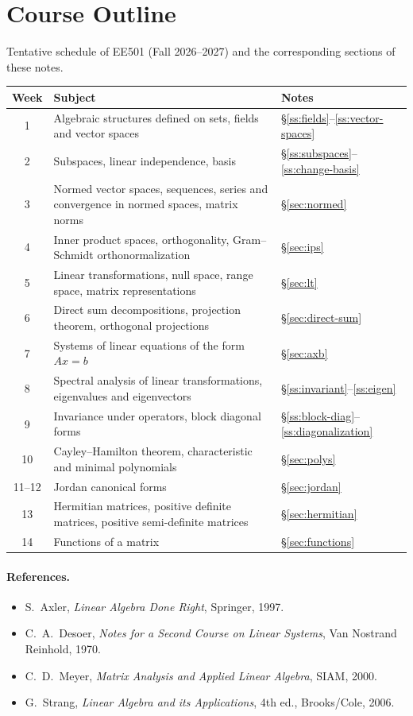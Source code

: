 \documentclass[11pt]{article}
\begin{document}
\section*{Course Outline}
Tentative schedule of EE501 (Fall 2026--2027) and the corresponding sections of these notes.
\begin{center}
\renewcommand{\arraystretch}{1.25}
\begin{tabular}{@{}c p{8.2cm} l@{}}
\toprule
\textbf{Week} & \textbf{Subject} & \textbf{Notes} \\
\midrule
1 & Algebraic structures defined on sets, fields and vector spaces & \S\ref{ss:fields}--\ref{ss:vector-spaces} \\
2 & Subspaces, linear independence, basis & \S\ref{ss:subspaces}--\ref{ss:change-basis} \\
3 & Normed vector spaces, sequences, series and convergence in normed spaces, matrix norms & \S\ref{sec:normed} \\
4 & Inner product spaces, orthogonality, Gram--Schmidt orthonormalization & \S\ref{sec:ips} \\
5 & Linear transformations, null space, range space, matrix representations & \S\ref{sec:lt} \\
6 & Direct sum decompositions, projection theorem, orthogonal projections & \S\ref{sec:direct-sum} \\
7 & Systems of linear equations of the form $Ax=b$ & \S\ref{sec:axb} \\
8 & Spectral analysis of linear transformations, eigenvalues and eigenvectors & \S\ref{ss:invariant}--\ref{ss:eigen} \\
9 & Invariance under operators, block diagonal forms & \S\ref{ss:block-diag}--\ref{ss:diagonalization} \\
10 & Cayley--Hamilton theorem, characteristic and minimal polynomials & \S\ref{sec:polys} \\
11--12 & Jordan canonical forms & \S\ref{sec:jordan} \\
13 & Hermitian matrices, positive definite matrices, positive semi-definite matrices & \S\ref{sec:hermitian} \\
14 & Functions of a matrix & \S\ref{sec:functions} \\
\bottomrule
\end{tabular}
\end{center}

\paragraph{References.}
\begin{itemize}[nosep]
\item S.~Axler, \textit{Linear Algebra Done Right}, Springer, 1997.
\item C.~A.~Desoer, \textit{Notes for a Second Course on Linear Systems}, Van Nostrand Reinhold, 1970.
\item C.~D.~Meyer, \textit{Matrix Analysis and Applied Linear Algebra}, SIAM, 2000.
\item G.~Strang, \textit{Linear Algebra and its Applications}, 4th ed., Brooks/Cole, 2006.
\end{itemize}
\clearpage










\end{document}
